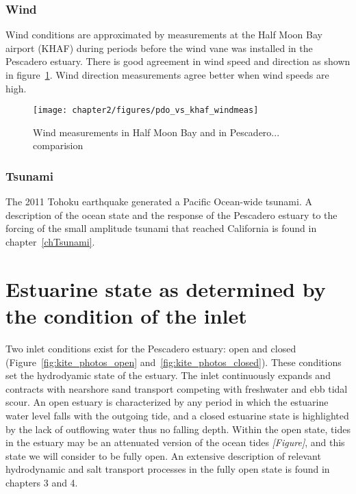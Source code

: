 \subsubsection{Wind}
Wind conditions are approximated by measurements at the Half Moon Bay airport (KHAF) during periods before the wind vane was installed in the Pescadero estuary.  There is good agreement in wind speed and direction as shown in figure~\ref{fig:PDOvsKHAFwind}. Wind direction measurements agree better when wind speeds are high.

\begin{figure}
\centering
		\texttt{[image: chapter2/figures/pdo\_vs\_khaf\_windmeas]} \caption{Wind measurements in Half Moon Bay and in Pescadero... comparision } \label{fig:PDOvsKHAFwind}
\end{figure}


\subsubsection{Tsunami}
The 2011 Tohoku earthquake generated a Pacific Ocean-wide tsunami. A description of the ocean state and the response of the Pescadero estuary to the forcing of the small amplitude tsunami that reached California is found in chapter~\ref{chTsunami}.



\section{Estuarine state as determined by the condition of the inlet}
\label{betterlabelmaybe}

Two inlet conditions exist for the Pescadero estuary: open and closed (Figure~\ref{fig:kite_photos_open} and~\ref{fig:kite_photos_closed}).  These conditions set the hydrodyamic state of the estuary. The inlet continuously expands and contracts with nearshore sand transport competing with freshwater and ebb tidal scour. An open estuary is characterized by any period in which the estuarine water level falls with the outgoing tide, and a closed estuarine state is highlighted by the lack of outflowing water thus no falling depth. Within the open state, tides in the estuary may be an attenuated version of the ocean tides \emph{[Figure]}, and this state we will consider to be fully open. An extensive description of relevant hydrodynamic and salt transport processes in the fully open state is found in chapters 3 and 4.


